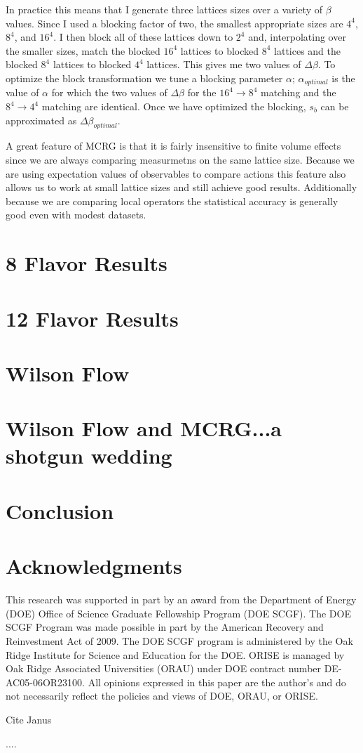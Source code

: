 \documentclass{PoS}
\begin{document}
In practice this means that I generate three lattices sizes over a variety of $\beta$ values.  Since I used a blocking factor of two, the smallest appropriate sizes are $4^4$, $8^4$, and $16^4$.  I then block all of these lattices down to $2^4$ and, interpolating over the smaller sizes, match the blocked $16^4$ lattices to blocked $8^4$ lattices and the blocked $8^4$ lattices to blocked $4^4$ lattices.  This gives me two values of $\Delta\beta$.  To optimize the block transformation we tune a blocking parameter $\alpha$; $\alpha_{optimal}$ is the value of $\alpha$ for which the two values of $\Delta\beta$ for the $16^4\to8^4$ matching and the $8^4\to4^4$ matching are identical.  Once we have optimized the blocking, $s_b$ can be approximated as $\Delta\beta_{optimal}$.

A great feature of MCRG is that it is fairly insensitive to finite volume effects since we are always comparing measurmetns on the same lattice size.  Because we are using expectation values of observables to compare actions this feature also allows us to work at small lattice sizes and still achieve good results.  Additionally because we are comparing local operators the statistical accuracy is generally good even with modest datasets.


\section{8 Flavor Results}

\section{12 Flavor Results}

\section{Wilson Flow}

\section{Wilson Flow and MCRG...a shotgun wedding}

\section{Conclusion}

\section{Acknowledgments}
This research was supported in part by an award from the Department of Energy (DOE) Office of Science Graduate Fellowship Program (DOE SCGF). The DOE SCGF Program was made possible in part by the American Recovery and Reinvestment Act of 2009.  The DOE SCGF program is administered by the Oak Ridge Institute for Science and Education for the DOE. ORISE is managed by Oak Ridge Associated Universities (ORAU) under DOE contract number DE-AC05-06OR23100.  All opinions expressed in this paper are the author's and do not necessarily reflect the policies and views of DOE, ORAU, or ORISE.

Cite Janus

\begin{thebibliography}{99}
   ....
\end{thebibliography}
\end{document}
